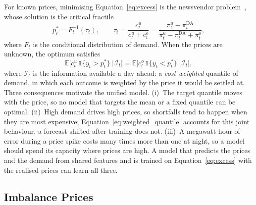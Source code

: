 For known prices, minimising Equation~\eqref{eq:excess} is the newsvendor
problem~\parencite{arrow1951optimal}, whose solution is the critical fractile
\begin{equation}
    p^*_t = F_t^{-1}(\tau_t), \qquad
    \tau_t = \frac{c^{u}_t}{c^{u}_t + c^{o}_t}
           = \frac{\pi^{u}_t - \pi^{\mathrm{DA}}_t}
                  {\pi^{u}_t - \pi^{\mathrm{DA}}_t + \pi^{o}_t},
    \label{eq:optimal_threshold}
\end{equation}
where $F_t$ is the conditional distribution of demand.  When the prices are
unknown, the optimum satisfies
\begin{equation}
    \mathbb{E}\big[c^u_t\,\mathbb{1}\{y_t > p^*_t\} \,\big|\, \mathcal{I}_t\big]
    = \mathbb{E}\big[c^o_t\,\mathbb{1}\{y_t < p^*_t\} \,\big|\, \mathcal{I}_t\big],
    \label{eq:weighted_quantile}
\end{equation}
where $\mathcal{I}_t$ is the information available a day ahead: a
\emph{cost-weighted} quantile of demand, in which each outcome is weighted by
the price it would be settled at.  Three consequences motivate the unified
model.  (i)~The target quantile moves with the price, so no model that
targets the mean or a fixed quantile can be optimal.  (ii)~High demand drives
high prices, so shortfalls tend to happen when they are most expensive;
Equation~\eqref{eq:weighted_quantile} accounts for this joint behaviour, a
forecast shifted after training does not.  (iii)~A megawatt-hour of error
during a price spike costs many times more than one at night, so a model
should spend its capacity where prices are high.  A model that predicts the
prices and the demand from shared features and is trained on
Equation~\eqref{eq:excess} with the realised prices can learn all three.

\subsection{Imbalance Prices}
\label{sec:synthetic-prices}

